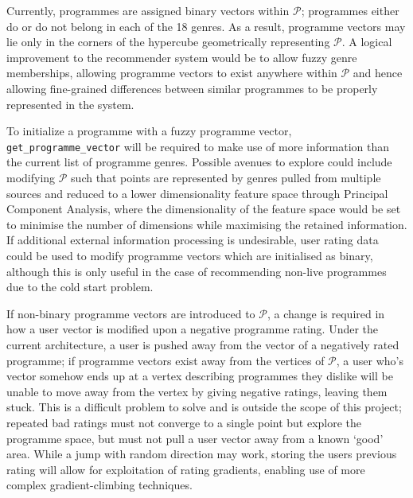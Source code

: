 		Currently, programmes are assigned binary vectors within $\mathcal{P}$; programmes either do or do not belong in each of the 18 genres. As a result, programme vectors may lie only in the corners of the hypercube geometrically representing $\mathcal{P}$. A logical improvement to the recommender system would be to allow fuzzy genre memberships, allowing programme vectors to exist anywhere within $\mathcal{P}$ and hence allowing fine-grained differences between similar programmes to be properly represented in the system.
		
		To initialize a programme with a fuzzy programme vector, \texttt{get\_programme\_vector} will be required to make use of more information than the current list of programme genres. Possible avenues to explore could include modifying $\mathcal{P}$ such that points are represented by genres pulled from multiple sources and reduced to a lower dimensionality feature space through Principal Component Analysis, where the dimensionality of the feature space would be set to minimise the number of dimensions while maximising the retained information. If additional external information processing is undesirable, user rating data could be used to modify programme vectors which are initialised as binary, although this is only useful in the case of recommending non-live programmes due to the cold start problem\citep{cold-start-problem}.

		If non-binary programme vectors are introduced to $\mathcal{P}$, a change is required in how a user vector is modified upon a negative programme rating. Under the current architecture, a user is pushed away from the vector of a negatively rated programme; if programme vectors exist away from the vertices of $\mathcal{P}$, a user who's vector somehow ends up at a vertex describing programmes they dislike will be unable to move away from the vertex by giving negative ratings, leaving them stuck. This is a difficult problem to solve and is outside the scope of this project; repeated bad ratings must not converge to a single point but explore the programme space, but must not pull a user vector away from a known `good' area. While a jump with random direction may work, storing the users previous rating will allow for exploitation of rating gradients, enabling use of more complex gradient-climbing techniques.

